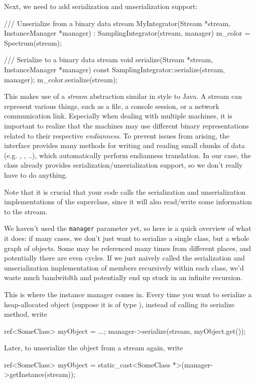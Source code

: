 Next, we need to add serialization and unserialization support:
\begin{cpp}
    /// Unserialize from a binary data stream
    MyIntegrator(Stream *stream, InstanceManager *manager)
     : SamplingIntegrator(stream, manager) {
        m_color = Spectrum(stream);
    }

    /// Serialize to a binary data stream
    void serialize(Stream *stream, InstanceManager *manager) const {
        SamplingIntegrator::serialize(stream, manager);
        m_color.serialize(stream);
    }
\end{cpp}
This makes use of a \emph{stream} abstraction similar in style to Java.
A stream can represent various things, such as a file, a console session, or a
network communication link. Especially when dealing with multiple machines,
it is important to realize that the machines may use different binary representations
related to their respective \emph{endianness}. To prevent issues from arising,
the  interface provides many methods for writing and reading
small chunks of data (e.g. , , ..),
which automatically perform endianness translation. In our case, the
 class already provides serialization/unserialization support,
so we don't really have to do anything.

Note that it is crucial that your code calls the serialization and unserialization
implementations of the superclass, since it will also read/write some
information to the stream.

We haven't used the \texttt{manager} parameter yet, so here is a quick overview
of what it does: if many cases, we don't just want to serialize a single class,
but a whole graph of objects. Some may be referenced many
times from different places, and potentially there are even cycles. If we just
naively called the serialization and unserialization implementation of members
recursively within each class, we'd waste much bandwitdth and potentially
end up stuck in an infinite recursion.

This is where the instance manager comes in. Every time you want to serialize
a heap-allocated object (suppose it is of type ),
instead of calling its serialize method, write

\begin{cpp}
ref<SomeClass> myObject = ...;
manager->serialize(stream, myObject.get());
\end{cpp}

Later, to unserialize the object from a stream again, write
\begin{cpp}
ref<SomeClass> myObject = static_cast<SomeClass *>(manager->getInstance(stream));
\end{cpp}

